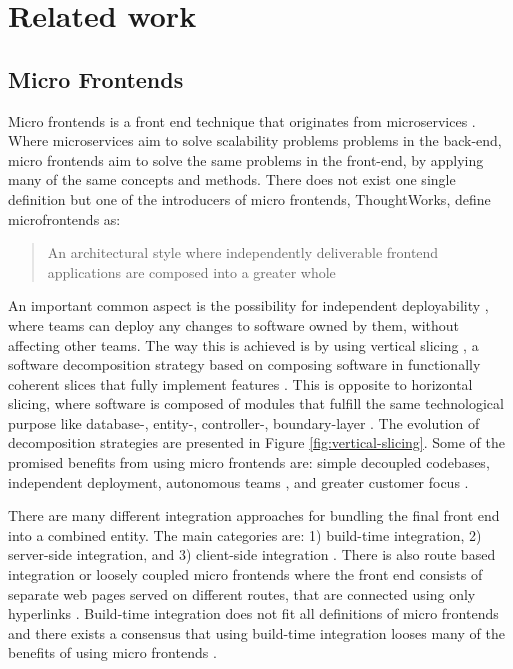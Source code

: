 \chapter{Related work}


\section{Micro Frontends}
Micro frontends is a front end technique that originates from microservices \cite{Jackson2019}. Where microservices aim to solve scalability problems problems in the back-end, micro frontends aim to solve the same problems in the front-end, by applying many of the same concepts and methods. There does not exist one single definition but one of the introducers of micro frontends, ThoughtWorks, define microfrontends as:
\blockquote{An architectural style where independently deliverable frontend applications are composed into a greater whole \cite{Jackson2019}}

An important common aspect is the possibility for independent deployability \cite{Jackson2019}, where teams can deploy any changes to software owned by them, without affecting other teams. The way this is achieved is by using vertical slicing \cite[ch.~1]{Geers2020}, a software decomposition strategy based on composing software in functionally coherent slices that fully implement features \cite{Ratner2011}. This is opposite to horizontal slicing, where software is composed of modules that fulfill the same technological purpose like database-, entity-, controller-, boundary-layer \cite{Ratner2011}. The evolution of decomposition strategies are presented in Figure \ref{fig:vertical-slicing}. Some of the promised benefits from using micro frontends are: simple decoupled codebases, independent deployment, autonomous teams \cite{Jackson2019}, and greater customer focus \cite[ch.~1]{Geers2020}. 

There are many different integration approaches for bundling the final front end into a combined entity. The main categories are: 1) build-time integration, 2) server-side integration, and 3) client-side integration \cite{Jackson2019, Geers2020}. There is also route based integration or loosely coupled micro frontends where the front end consists of separate web pages served on different routes, that are connected using only hyperlinks \cites[ch.~2]{Geers2020}{Yang2019}. Build-time integration does not fit all definitions of micro frontends \cite{Geers2020} and there exists a consensus that using build-time integration looses many of the benefits of using micro frontends \cite{Jackson2019}.

